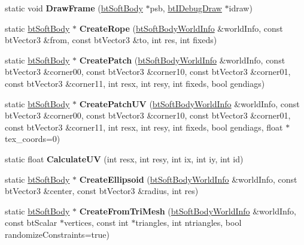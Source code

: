 \begin{DoxyCompactItemize}
static void {\bfseries Draw\+Frame} (\hyperlink{classbtSoftBody}{bt\+Soft\+Body} $\ast$psb, \hyperlink{classbtIDebugDraw}{bt\+I\+Debug\+Draw} $\ast$idraw)
\item 
\mbox{\label{structbtSoftBodyHelpers_ae181781df4faf89ab9ae95367fcd249f}} 
static \hyperlink{classbtSoftBody}{bt\+Soft\+Body} $\ast$ {\bfseries Create\+Rope} (\hyperlink{structbtSoftBodyWorldInfo}{bt\+Soft\+Body\+World\+Info} \&world\+Info, const bt\+Vector3 \&from, const bt\+Vector3 \&to, int res, int fixeds)
\item 
\mbox{\label{structbtSoftBodyHelpers_a40b5859c925488ce533c020aa7c41202}} 
static \hyperlink{classbtSoftBody}{bt\+Soft\+Body} $\ast$ {\bfseries Create\+Patch} (\hyperlink{structbtSoftBodyWorldInfo}{bt\+Soft\+Body\+World\+Info} \&world\+Info, const bt\+Vector3 \&corner00, const bt\+Vector3 \&corner10, const bt\+Vector3 \&corner01, const bt\+Vector3 \&corner11, int resx, int resy, int fixeds, bool gendiags)
\item 
\mbox{\label{structbtSoftBodyHelpers_a1f7bfd324af3b2007a7d8b759ba4b53b}} 
static \hyperlink{classbtSoftBody}{bt\+Soft\+Body} $\ast$ {\bfseries Create\+Patch\+UV} (\hyperlink{structbtSoftBodyWorldInfo}{bt\+Soft\+Body\+World\+Info} \&world\+Info, const bt\+Vector3 \&corner00, const bt\+Vector3 \&corner10, const bt\+Vector3 \&corner01, const bt\+Vector3 \&corner11, int resx, int resy, int fixeds, bool gendiags, float $\ast$tex\+\_\+coords=0)
\item 
\mbox{\label{structbtSoftBodyHelpers_a7d29e3138e4c6a657e6cb38da01059e0}} 
static float {\bfseries Calculate\+UV} (int resx, int resy, int ix, int iy, int id)
\item 
\mbox{\label{structbtSoftBodyHelpers_a72759ba7ef471e2eee6ca79e670e74d4}} 
static \hyperlink{classbtSoftBody}{bt\+Soft\+Body} $\ast$ {\bfseries Create\+Ellipsoid} (\hyperlink{structbtSoftBodyWorldInfo}{bt\+Soft\+Body\+World\+Info} \&world\+Info, const bt\+Vector3 \&center, const bt\+Vector3 \&radius, int res)
\item 
\mbox{\label{structbtSoftBodyHelpers_a272cdc7d6d2ad911550d823419bdd3e7}} 
static \hyperlink{classbtSoftBody}{bt\+Soft\+Body} $\ast$ {\bfseries Create\+From\+Tri\+Mesh} (\hyperlink{structbtSoftBodyWorldInfo}{bt\+Soft\+Body\+World\+Info} \&world\+Info, const bt\+Scalar $\ast$vertices, const int $\ast$triangles, int ntriangles, bool randomize\+Constraints=true)

\end{DoxyCompactItemize}
